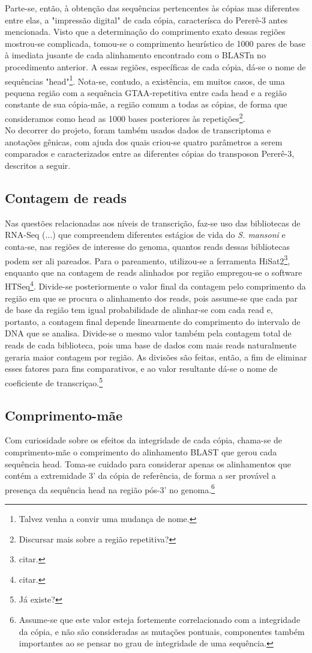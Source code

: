 \documentclass{article}
\begin{document}
\begin{multicols}{2}
	Parte-se, então, à obtenção das sequências pertencentes às cópias mas diferentes entre elas, a "impressão digital" de cada cópia, caracterísca do Pererê-3 antes mencionada. Visto que a determinação do comprimento exato dessas regiões mostrou-se complicada, tomou-se o comprimento heurístico de 1000 pares de base à imediata jusante de cada alinhamento encontrado com o BLASTn no procedimento anterior. A essas regiões, específicas de cada cópia, dá-se o nome de sequências "head"\footnote{Talvez venha a convir uma mudança de nome.}. Nota-se, contudo, a existência, em muitos casos, de uma pequena região com a sequência GTAA-repetitiva entre cada head e a região constante de sua cópia-mãe, a região comum a todas as cópias, de forma que consideramos como head as 1000 bases posteriores às repetições\footnote{Discursar mais sobre a região repetitiva?}.\\

No decorrer do projeto, foram também usados dados de transcriptoma e anotações gênicas, com ajuda dos quais criou-se quatro parâmetros a serem comparados e caracterizados entre as diferentes cópias do transposon Pererê-3, descritos a seguir.

\subsection{Contagem de reads}
	Nas questões relacionadas aos níveis de transcrição, faz-se uso das bibliotecas de RNA-Seq (...) que compreendem diferentes estágios de vida do \textit{S. mansoni} e conta-se, nas regiões de interesse do genoma, quantos reads dessas bibliotecas podem ser ali pareados. Para o pareamento, utilizou-se a ferramenta HiSat2\footnote{citar.}, enquanto que na contagem de reads alinhados por região empregou-se o software HTSeq\footnote{citar.}. Divide-se posteriormente o valor final da contagem pelo comprimento da região em que se procura o alinhamento dos reads, pois assume-se que cada par de base da região tem igual probabilidade de alinhar-se com cada read e, portanto, a contagem final depende linearmente do comprimento do intervalo de DNA que se analisa. Divide-se o mesmo valor também pela contagem total de reads de cada biblioteca, pois uma base de dados com mais reads naturalmente geraria maior contagem por região. As divisões são feitas, então, a fim de eliminar esses fatores para fins comparativos, e ao valor resultante dá-se o nome de coeficiente de transcriçao.\footnote{Já existe?}

\subsection{Comprimento-mãe}
	Com curiosidade sobre os efeitos da integridade de cada cópia, chama-se de comprimento-mãe o comprimento do alinhamento BLAST que gerou cada sequência head. Toma-se cuidado para considerar apenas os alinhamentos que contém a extremidade 3' da cópia de referência, de forma a ser provável a presença da sequência head na região pós-3' no genoma.\footnote{Assume-se que este valor esteja fortemente correlacionado com a integridade da cópia, e não são consideradas as mutações pontuais, componentes também importantes ao se pensar no grau de integridade de uma sequência.}


\end{multicols}
\end{document}
